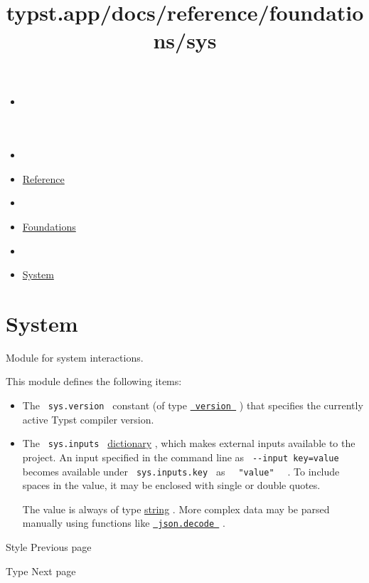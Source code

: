 \title{typst.app/docs/reference/foundations/sys}

\begin{itemize}
\tightlist
\item
  \href{/docs}{}
\item
  
\item
  \href{/docs/reference/}{Reference}
\item
  
\item
  \href{/docs/reference/foundations/}{Foundations}
\item
  
\item
  \href{/docs/reference/foundations/sys}{System}
\end{itemize}

\section{System}\label{summary}

Module for system interactions.

This module defines the following items:

\begin{itemize}
\item
  The \texttt{\ sys.version\ } constant (of type
  \href{/docs/reference/foundations/version/}{\texttt{\ version\ }} )
  that specifies the currently active Typst compiler version.
\item
  The \texttt{\ sys.inputs\ }
  \href{/docs/reference/foundations/dictionary/}{dictionary} , which
  makes external inputs available to the project. An input specified in
  the command line as \texttt{\ -\/-input\ key=value\ } becomes
  available under \texttt{\ sys.inputs.key\ } as
  \texttt{\ }{\texttt{\ "value"\ }}\texttt{\ } . To include spaces in
  the value, it may be enclosed with single or double quotes.

  The value is always of type
  \href{/docs/reference/foundations/str/}{string} . More complex data
  may be parsed manually using functions like
  \href{/docs/reference/data-loading/json/\#definitions-decode}{\texttt{\ json.decode\ }}
  .
\end{itemize}

\href{/docs/reference/foundations/style/}{\pandocbounded{}}

{ Style } { Previous page }

\href{/docs/reference/foundations/type/}{\pandocbounded{}}

{ Type } { Next page }
